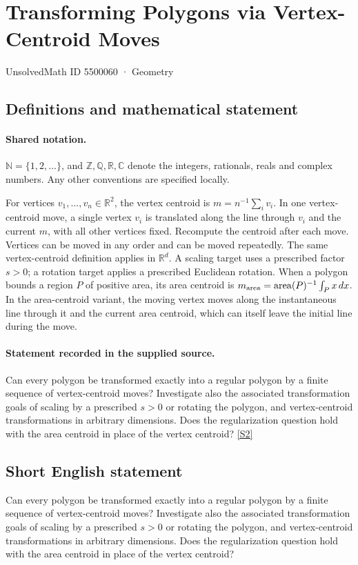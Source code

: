 \documentclass[11pt]{article}
\newcommand{\sref}[2]{\hyperlink{source:#1:#2}{[S#2]}}
\begin{document}
\setcounter{section}{5500059}
\section{Transforming Polygons via Vertex-Centroid Moves}\label{5500060}
{\small\sffamily UnsolvedMath ID 5500060 · Geometry}
\subsection{Definitions and mathematical statement}

\paragraph{Shared notation.}$\mathbb N=\{1,2,\ldots\}$, and $\mathbb Z,\mathbb Q,\mathbb R,\mathbb C$ denote the integers, rationals, reals and complex numbers. Any other conventions are specified locally.


For vertices $v_1,\ldots,v_n\in\mathbb R^2$, the vertex centroid is $m=n^{-1}\sum_i v_i$. In one vertex-centroid move, a single vertex $v_i$ is translated along the line through $v_i$ and the current $m$, with all other vertices fixed. Recompute the centroid after each move. Vertices can be moved in any order and can be moved repeatedly. The same vertex-centroid definition applies in $\mathbb R^d$. A scaling target uses a prescribed factor $s>0$; a rotation target applies a prescribed Euclidean rotation. When a polygon bounds a region $P$ of positive area, its area centroid is $m_{\rm area}=\operatorname{area}(P)^{-1}\int_P x\,dx$. In the area-centroid variant, the moving vertex moves along the instantaneous line through it and the current area centroid, which can itself leave the initial line during the move.
\paragraph{Statement recorded in the supplied source.}
Can every polygon be transformed exactly into a regular polygon by a finite sequence of vertex-centroid moves? Investigate also the associated transformation goals of scaling by a prescribed $s>0$ or rotating the polygon, and vertex-centroid transformations in arbitrary dimensions. Does the regularization question hold with the area centroid in place of the vertex centroid? \sref{5500060}{2}
\subsection{Short English statement}
Can every polygon be transformed exactly into a regular polygon by a finite sequence of vertex-centroid moves? Investigate also the associated transformation goals of scaling by a prescribed $s>0$ or rotating the polygon, and vertex-centroid transformations in arbitrary dimensions. Does the regularization question hold with the area centroid in place of the vertex centroid?
\end{document}

